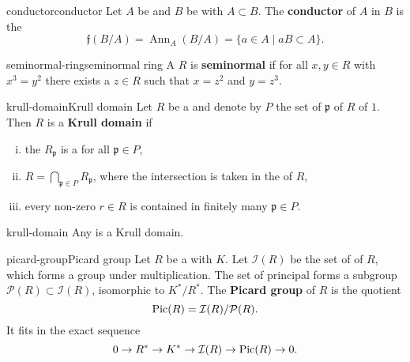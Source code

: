 \begin{topic}{conductor}{conductor}
    Let $A$ be and $B$ be  with $A \subset B$. The \textbf{conductor} of $A$ in $B$ is the 
    \[ \mathfrak{f}(B/A) = \operatorname{Ann}_A(B/A) = \{ a \in A \mid a B \subset A \} . \]
\end{topic}

\begin{topic}{seminormal-ring}{seminormal ring}
    A   $R$ is \textbf{seminormal} if for all $x, y \in R$ with $x^3 = y^2$ there exists a $z \in R$ such that $x = z^2$ and $y = z^3$.
\end{topic}

\begin{topic}{krull-domain}{Krull domain}
    Let $R$ be a  and denote by $P$ the set of  $\mathfrak{p}$ of $R$ of  $1$. Then $R$ is a \textbf{Krull domain} if
    \begin{enumerate}[(i)]
        \item the  $R_\mathfrak{p}$ is a  for all $\mathfrak{p} \in P$,
        \item $R = \bigcap_{\mathfrak{p} \in P} R_\mathfrak{p}$, where the intersection is taken in the  of $R$,
        \item every non-zero $r \in R$ is contained in finitely many $\mathfrak{p} \in P$.
    \end{enumerate}
\end{topic}

\begin{example}{krull-domain}
    Any  is a Krull domain.
\end{example}

\begin{topic}{picard-group}{Picard group}
    Let $R$ be a  with  $K$. Let $\mathcal{I}(R)$ be the set of  of $R$, which forms a group under multiplication. The set of principal  forms a subgroup $\mathcal{P}(R) \subset \mathcal{I}(R)$, isomorphic to $K^* / R^*$. The \textbf{Picard group} of $R$ is the quotient
    \[ \textup{Pic}(R) = \mathcal{I}(R) / \mathcal{P}(R) . \]
    It fits in the exact sequence
    \[ 0 \to R^* \to K^* \to \mathcal{I}(R) \to \textup{Pic}(R) \to 0 . \]
\end{topic}

